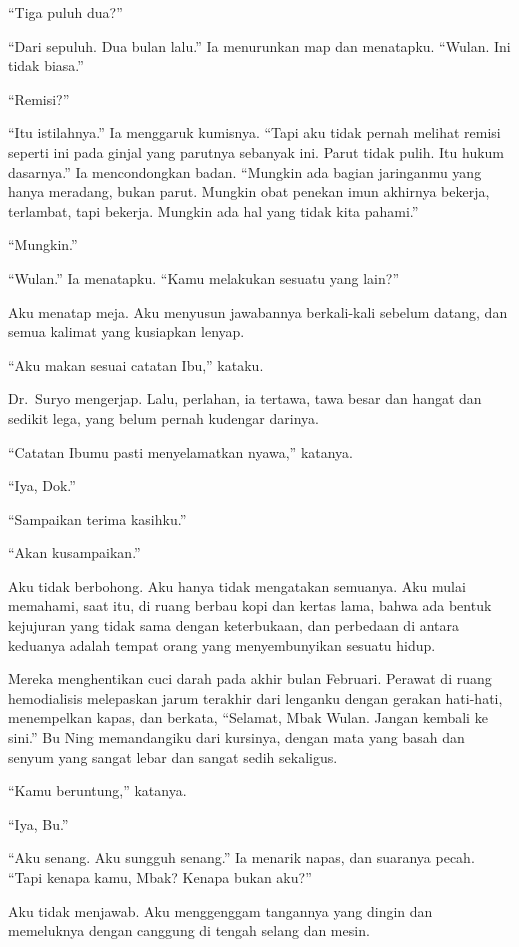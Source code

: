 \documentclass[11pt,twoside,openany]{book}
\begin{document}
``Tiga puluh dua?''

``Dari sepuluh. Dua bulan lalu.'' Ia menurunkan map dan menatapku. ``Wulan. Ini tidak biasa.''

``Remisi?''

``Itu istilahnya.'' Ia menggaruk kumisnya. ``Tapi aku tidak pernah melihat remisi seperti ini pada ginjal yang parutnya sebanyak ini. Parut tidak pulih. Itu hukum dasarnya.'' Ia mencondongkan badan. ``Mungkin ada bagian jaringanmu yang hanya meradang, bukan parut. Mungkin obat penekan imun akhirnya bekerja, terlambat, tapi bekerja. Mungkin ada hal yang tidak kita pahami.''

``Mungkin.''

``Wulan.'' Ia menatapku. ``Kamu melakukan sesuatu yang lain?''

Aku menatap meja. Aku menyusun jawabannya berkali-kali sebelum datang, dan semua kalimat yang kusiapkan lenyap.

``Aku makan sesuai catatan Ibu,'' kataku.

Dr.~Suryo mengerjap. Lalu, perlahan, ia tertawa, tawa besar dan hangat dan sedikit lega, yang belum pernah kudengar darinya.

``Catatan Ibumu pasti menyelamatkan nyawa,'' katanya.

``Iya, Dok.''

``Sampaikan terima kasihku.''

``Akan kusampaikan.''

Aku tidak berbohong. Aku hanya tidak mengatakan semuanya. Aku mulai memahami, saat itu, di ruang berbau kopi dan kertas lama, bahwa ada bentuk kejujuran yang tidak sama dengan keterbukaan, dan perbedaan di antara keduanya adalah tempat orang yang menyembunyikan sesuatu hidup.

Mereka menghentikan cuci darah pada akhir bulan Februari. Perawat di ruang hemodialisis melepaskan jarum terakhir dari lenganku dengan gerakan hati-hati, menempelkan kapas, dan berkata, ``Selamat, Mbak Wulan. Jangan kembali ke sini.'' Bu Ning memandangiku dari kursinya, dengan mata yang basah dan senyum yang sangat lebar dan sangat sedih sekaligus.

``Kamu beruntung,'' katanya.

``Iya, Bu.''

``Aku senang. Aku sungguh senang.'' Ia menarik napas, dan suaranya pecah. ``Tapi kenapa kamu, Mbak? Kenapa bukan aku?''

Aku tidak menjawab. Aku menggenggam tangannya yang dingin dan memeluknya dengan canggung di tengah selang dan mesin.
\end{document}
